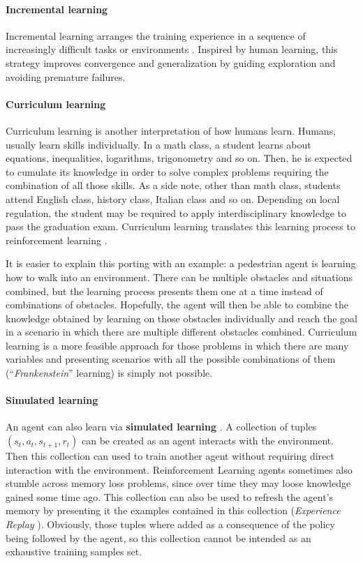 \paragraph{Incremental learning}

Incremental learning arranges the training experience in a sequence of increasingly difficult tasks or environments \cite{narvekar2020curriculum}.
Inspired by human learning, this strategy improves convergence and generalization by guiding exploration and avoiding premature failures.

\paragraph{Curriculum learning}

Curriculum learning is another interpretation of how humans learn.
Humans, usually learn skills individually. In a math class, a student learns about equations, inequalities, logarithms, trigonometry and so on. Then, he is expected to cumulate its knowledge in order to solve complex problems requiring the combination of all those skills. As a side note, other than math class, students attend English class, history class, Italian class and so on. Depending on local regulation, the student may be required to apply interdisciplinary knowledge to pass the graduation exam.
Curriculum learning translates this learning process to reinforcement learning \cite{narvekar2020curriculum}.

It is easier to explain this porting with an example: a pedestrian agent is learning how to walk into an environment.
There can be multiple obstacles and situations combined, but the learning process presents them one at a time instead of combinations of obstacles.
Hopefully, the agent will then be able to combine the knowledge obtained by learning on those obstacles individually and reach the goal in a scenario in which there are multiple different obstacles combined.
Curriculum learning is a more feasible approach for those problems in which there are many variables and presenting scenarios with all the possible combinations of them (``\textit{Frankenstein}'' learning) is simply not possible.

\paragraph{Simulated learning}

An agent can also learn via \textbf{simulated learning} \cite{lin1992self}.
A collection of tuples $(s_t, a_t, s_{t+1}, r_t)$ can be created as an agent interacts with the environment.
Then this collection can used to train another agent without requiring direct interaction with the environment.
Reinforcement Learning agents sometimes also stumble across memory loss problems, since over time they may loose knowledge gained some time ago.
This collection can also be used to refresh the agent's memory by presenting it the examples contained in this collection (\textit{Experience Replay} \cite{lin1992self}).
Obviously, those tuples where added as a consequence of the policy being followed by the agent, so this collection cannot be intended as an exhaustive training samples set.
